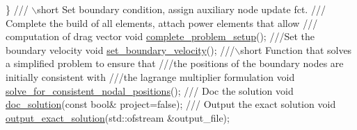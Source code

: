 \begin{DoxyCodeInclude}
  \}
 \textcolor{comment}{}
\textcolor{comment}{ /// \(\backslash\)short Set boundary condition, assign auxiliary node update fct.}
\textcolor{comment}{ /// Complete the build of all elements, attach power elements that allow}
\textcolor{comment}{ /// computation of drag vector}
\textcolor{comment}{} \textcolor{keywordtype}{void} \hyperlink{classUnstructuredImmersedEllipseProblem_a42b13e3306ff2a94053907644ba17c8d}{complete\_problem\_setup}();
\textcolor{comment}{}
\textcolor{comment}{ ///Set the boundary velocity}
\textcolor{comment}{} \textcolor{keywordtype}{void} \hyperlink{classUnstructuredImmersedEllipseProblem_ab201b187b240105fd8d444d943f6dada}{set\_boundary\_velocity}();
\textcolor{comment}{}
\textcolor{comment}{ ///\(\backslash\)short Function that solves a simplified problem to ensure that }
\textcolor{comment}{ ///the positions of the boundary nodes are initially consistent with}
\textcolor{comment}{ ///the lagrange multiplier formulation}
\textcolor{comment}{} \textcolor{keywordtype}{void} \hyperlink{classUnstructuredImmersedEllipseProblem_a2a88b40ff1988de0fc696f1eb755ea54}{solve\_for\_consistent\_nodal\_positions}();
\textcolor{comment}{}
\textcolor{comment}{ /// Doc the solution}
\textcolor{comment}{} \textcolor{keywordtype}{void} \hyperlink{classUnstructuredImmersedEllipseProblem_a08e12dd83c98f96e14e8152cc758d398}{doc\_solution}(\textcolor{keyword}{const} \textcolor{keywordtype}{bool}& project=\textcolor{keyword}{false});
  \textcolor{comment}{}
\textcolor{comment}{ /// Output the exact solution}
\textcolor{comment}{} \textcolor{keywordtype}{void} \hyperlink{classUnstructuredImmersedEllipseProblem_a29a232dfac18ea901332bebdc14fad15}{output\_exact\_solution}(std::ofstream &output\_file);


\end{DoxyCodeInclude}
